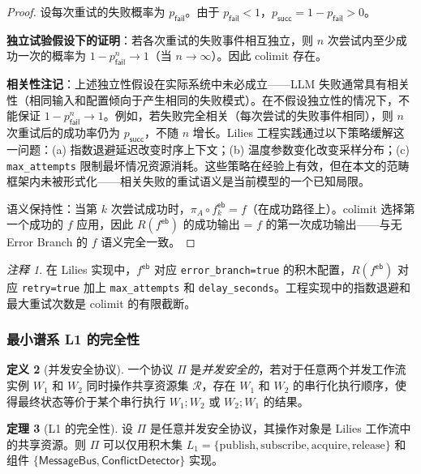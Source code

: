 \documentclass[11pt,a4paper]{article}
\theoremstyle{definition}
\newtheorem{theorem}{定理}[section]
\theoremstyle{definition}
\newtheorem{definition}[theorem]{定义}
\theoremstyle{remark}
\newtheorem{remark}[theorem]{注释}
\begin{document}
\begin{proof}
设每次重试的失败概率为 $p_{\mathsf{fail}}$。由于 $p_{\mathsf{fail}} < 1$，$p_{\mathsf{succ}} = 1 - p_{\mathsf{fail}} > 0$。

\textbf{独立试验假设下的证明}：若各次重试的失败事件相互独立，则 $n$ 次尝试内至少成功一次的概率为 $1 - p_{\mathsf{fail}}^n \to 1$（当 $n \to \infty$）。因此 colimit 存在。

\textbf{相关性注记}：上述独立性假设在实际系统中未必成立——LLM 失败通常具有相关性（相同输入和配置倾向于产生相同的失败模式）。在不假设独立性的情况下，不能保证 $1 - p_{\mathsf{fail}}^n \to 1$。例如，若失败完全相关（每次尝试的失败事件相同），则 $n$ 次重试后的成功率仍为 $p_{\mathsf{succ}}$，不随 $n$ 增长。Lilies 工程实践通过以下策略缓解这一问题：(a) 指数退避延迟改变时序上下文；(b) 温度参数变化改变采样分布；(c) \texttt{max\_attempts} 限制最坏情况资源消耗。这些策略在经验上有效，但在本文的范畴框架内未被形式化——相关失败的重试语义是当前模型的一个已知局限。

语义保持性：当第 $k$ 次尝试成功时，$\pi_A \circ f^{\mathsf{eb}}_k = f$（在成功路径上）。colimit 选择第一个成功的 $f$ 应用，因此 $R(f^{\mathsf{eb}})$ 的成功输出 = $f$ 的第一次成功输出——与无 Error Branch 的 $f$ 语义完全一致。
\end{proof}

\begin{remark}
在 Lilies 实现中，$f^{\mathsf{eb}}$ 对应 \texttt{error\_branch=true} 的积木配置，$R(f^{\mathsf{eb}})$ 对应 \texttt{retry=true} 加上 \texttt{max\_attempts} 和 \texttt{delay\_seconds}。工程实现中的指数退避和最大重试次数是 colimit 的有限截断。
\end{remark}

\subsubsection{最小谱系 L1 的完全性}

\begin{definition}[并发安全协议]
一个协议 $\Pi$ 是\emph{并发安全的}，若对于任意两个并发工作流实例 $W_1$ 和 $W_2$ 同时操作共享资源集 $\mathcal{R}$，存在 $W_1$ 和 $W_2$ 的串行化执行顺序，使得最终状态等价于某个串行执行 $W_1; W_2$ 或 $W_2; W_1$ 的结果。
\end{definition}

\begin{theorem}[L1 的完全性]\label{thm:l1-completeness}
设 $\Pi$ 是任意并发安全协议，其操作对象是 Lilies 工作流中的共享资源。则 $\Pi$ 可以仅用积木集 $L_1 = \{\mathrm{publish}, \mathrm{subscribe}, \mathrm{acquire}, \mathrm{release}\}$ 和组件 $\{\mathsf{MessageBus}, \mathsf{ConflictDetector}\}$ 实现。
\end{theorem}
\end{document}
